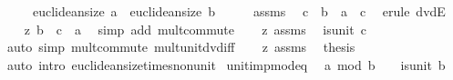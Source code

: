 \begin{isabellebody}
\ \ \ \ \ {\isachardoublequoteopen}euclidean{\isacharunderscore}{\kern0pt}size\ a\ {\isacharless}{\kern0pt}\ euclidean{\isacharunderscore}{\kern0pt}size\ b{\isachardoublequoteclose}\isanewline
%
\isadelimproof
%
\endisadelimproof
%
\isatagproof
{}\isamarkupfalse%
\ {\isacharminus}{\kern0pt}\isanewline
\ \ \isamarkupfalse%
\ assms{\isacharparenleft}{\kern0pt}{}{\isacharparenright}{\kern0pt}\ \isamarkupfalse%
\ c\ \ {\isachardoublequoteopen}b\ {\isacharequal}{\kern0pt}\ a\ {\isacharasterisk}{\kern0pt}\ c{\isachardoublequoteclose}\ \isamarkupfalse%
\ {\isacharparenleft}{\kern0pt}erule\ dvdE{\isacharparenright}{\kern0pt}\isanewline
\ \ \isamarkupfalse%
\ z{\isacharcolon}{\kern0pt}\ {\isachardoublequoteopen}b\ {\isacharequal}{\kern0pt}\ c\ {\isacharasterisk}{\kern0pt}\ a{\isachardoublequoteclose}\ \isamarkupfalse%
\ {\isacharparenleft}{\kern0pt}simp\ add{\isacharcolon}{\kern0pt}\ mult{\isachardot}{\kern0pt}commute{\isacharparenright}{\kern0pt}\isanewline
\ \ \isamarkupfalse%
\ z\ assms\ \isamarkupfalse%
\ {\isachardoublequoteopen}{\isasymnot}is{\isacharunderscore}{\kern0pt}unit\ c{\isachardoublequoteclose}\ \isamarkupfalse%
\ {\isacharparenleft}{\kern0pt}auto\ simp{\isacharcolon}{\kern0pt}\ mult{\isachardot}{\kern0pt}commute\ mult{\isacharunderscore}{\kern0pt}unit{\isacharunderscore}{\kern0pt}dvd{\isacharunderscore}{\kern0pt}iff{\isacharparenright}{\kern0pt}\isanewline
\ \ \isamarkupfalse%
\ z\ assms\ \isamarkupfalse%
\ {\isacharquery}{\kern0pt}thesis\isanewline
\ \ \ \ \isamarkupfalse%
\ {\isacharparenleft}{\kern0pt}auto\ intro{\isacharbang}{\kern0pt}{\isacharcolon}{\kern0pt}\ euclidean{\isacharunderscore}{\kern0pt}size{\isacharunderscore}{\kern0pt}times{\isacharunderscore}{\kern0pt}nonunit{\isacharparenright}{\kern0pt}\isanewline
{}\isamarkupfalse%
%
\endisatagproof
{\isafoldproof}%
%
\isadelimproof
\isanewline
%
\endisadelimproof
\isanewline
{}\isamarkupfalse%
\ unit{\isacharunderscore}{\kern0pt}imp{\isacharunderscore}{\kern0pt}mod{\isacharunderscore}{\kern0pt}eq{\isacharunderscore}{\kern0pt}{}{\isacharcolon}{\kern0pt}\isanewline
\ \ {\isachardoublequoteopen}a\ mod\ b\ {\isacharequal}{\kern0pt}\ {}{\isachardoublequoteclose}\ \ {\isachardoublequoteopen}is{\isacharunderscore}{\kern0pt}unit\ b{\isachardoublequoteclose}\isanewline
%
\isadelimproof
\ \ %

\end{isabellebody}
